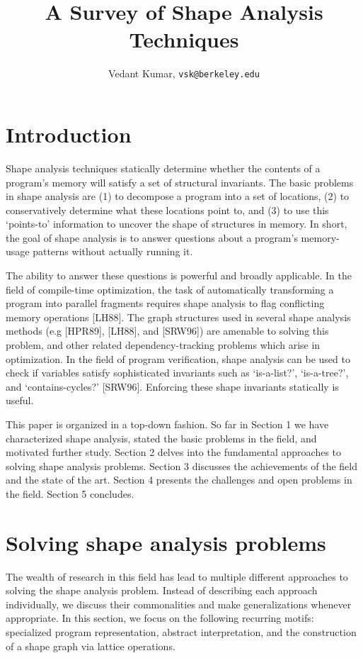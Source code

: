 \documentclass{article}
\title{A Survey of Shape Analysis Techniques}
\author{Vedant Kumar, \texttt{vsk@berkeley.edu}}
\begin{document}
\maketitle

\section{Introduction}

Shape analysis techniques statically determine whether the contents of a
program's memory will satisfy a set of structural invariants. The basic
problems in shape analysis are (1) to decompose a program into a set of
locations, (2) to conservatively determine what these locations point to,
and (3) to use this `points-to' information to uncover the shape of
structures in memory. In short, the goal of shape analysis is to answer
questions about a program's memory-usage patterns without actually running 
it.

The ability to answer these questions is powerful and broadly applicable. In
the field of compile-time optimization, the task of automatically
transforming a program into parallel fragments requires shape analysis to
flag conflicting memory operations [LH88]. The graph structures used in
several shape analysis methods (e.g [HPR89], [LH88], and [SRW96]) are
amenable to solving this problem, and other related dependency-tracking
problems which arise in optimization. In the field of program verification,
shape analysis can be used to check if variables satisfy sophisticated
invariants such as `is-a-list?', `is-a-tree?', and `contains-cycles?'
[SRW96]. Enforcing these shape invariants statically is useful.

This paper is organized in a top-down fashion. So far in Section 1 we have
characterized shape analysis, stated the basic problems in the field, and
motivated further study. Section 2 delves into the fundamental approaches to
solving shape analysis problems. Section 3 discusses the achievements of the
field and the state of the art. Section 4 presents the challenges and open
problems in the field. Section 5 concludes.

\section{Solving shape analysis problems}

The wealth of research in this field has lead to multiple different
approaches to solving the shape analysis problem. Instead of describing each
approach individually, we discuss their commonalities and make
generalizations whenever appropriate. In this section, we focus on the
following recurring motifs: specialized program representation, abstract
interpretation, and the construction of a shape graph via lattice
operations.
\end{document}
